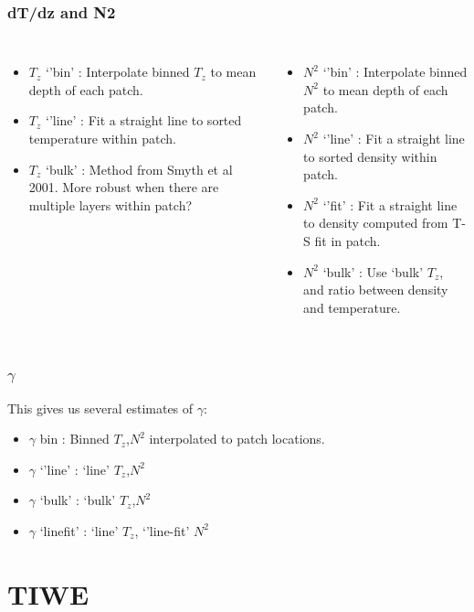\documentclass{beamer}
\begin{document}
\begin{frame}
 \frametitle{dT/dz and N2}
 
 
\begin{columns}
\begin{itemize}
\item $T_z$ `'bin' : Interpolate binned $T_z$ to mean depth of each patch.
\item $T_z$ `'line' : Fit a straight line to sorted temperature within patch.
\item $T_z$ `bulk' : Method from Smyth et al 2001. More robust when there are multiple layers within patch?
\end{itemize}

\begin{itemize}
\item $N^2$ `'bin' : Interpolate binned $N^2$ to mean depth of each patch.
\item $N^2$ `'line' : Fit a straight line to sorted density within patch.
\item $N^2$ `'fit' : Fit a straight line to density computed from T-S fit in patch.
\item $N^2$ `bulk' : Use `bulk' $T_z$, and ratio between density and temperature.
\end{itemize}

\end{columns}

\end{frame}




\begin{frame}
 \frametitle{$\gamma$}

This gives us several estimates of $\gamma$: 
\begin{itemize}
\item $\gamma$ bin : Binned $T_z$,$N^2$ interpolated to patch locations.
\item $\gamma$ `'line' : `line' $T_z$,$N^2$
\item $\gamma$ `bulk' : `bulk' $T_z$,$N^2$
\item $\gamma$ `linefit' : `line' $T_z$, `'line-fit' $N^2$
\end{itemize}

\end{frame}



\section{TIWE}
\end{document}
